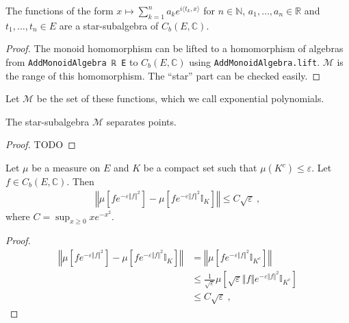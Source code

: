 \begin{lemma}\label{lem:starSubalgebra_expPoly}
 \leanok
The functions of the form $x \mapsto \sum_{k=1}^n a_k e^{i\langle t_k, x\rangle}$ for $n \in \mathbb{N}$, $a_1, \ldots, a_n \in \mathbb{R}$ and $t_1, \ldots, t_n \in E$ are a star-subalgebra of $C_b(E, \mathbb{C})$. 
\end{lemma}

\begin{proof} \leanok
The monoid homomorphism can be lifted to a homomorphism of algebras from \texttt{AddMonoidAlgebra ℝ E} to $C_b(E, \mathbb{C})$ using \texttt{AddMonoidAlgebra.lift}. $\mathcal M$ is the range of this homomorphism. The ``star'' part can be checked easily.
\end{proof}

Let $\mathcal M$ be the set of these functions, which we call exponential polynomials.

\begin{lemma}\label{lem:separating_expPoly}
 \leanok
{}
The star-subalgebra $\mathcal M$ separates points.
\end{lemma}

\begin{proof}
TODO
\end{proof}

\begin{lemma}\label{lem:integral_restrict_compact}
Let $\mu$ be a measure on $E$ and $K$ be a compact set such that $\mu(K^c) \le \varepsilon$. Let $f \in C_b(E, \mathbb{C})$. Then
\begin{align*}
\left\Vert \mu[fe^{-\varepsilon \Vert f \Vert^2}] - \mu[f e^{-\varepsilon \Vert f \Vert^2} \mathbb{I}_K] \right\Vert
\le C \sqrt{\varepsilon} \: ,
\end{align*}
where $C = \sup_{x \ge 0} x e^{-x^2}$.
\end{lemma}

\begin{proof}
\begin{align*}
\left\Vert \mu[fe^{-\varepsilon \Vert f \Vert^2}] - \mu[f e^{-\varepsilon \Vert f \Vert^2} \mathbb{I}_K] \right\Vert
&= \left\Vert \mu[f e^{-\varepsilon \Vert f \Vert^2} \mathbb{I}_{K^c}] \right\Vert
\\
&\le \frac{1}{\sqrt{\varepsilon}} \mu \left[ \sqrt{\varepsilon} \Vert f \Vert e^{-\varepsilon \Vert f \Vert^2} \mathbb{I}_{K^c} \right]
\\
&\le C \sqrt{\varepsilon} \: ,
\end{align*}
\end{proof}

